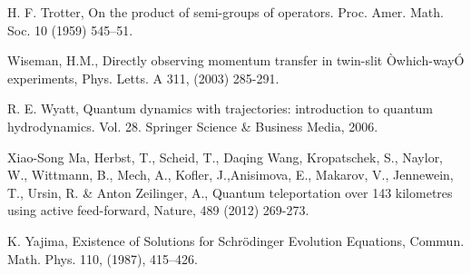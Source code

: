 \documentclass[12pt]{article}%
\begin{document}
\begin{thebibliography}{99}
H. F. Trotter, On the product of semi-groups of operators.
Proc. Amer. Math. Soc. 10 (1959) 545--51.

Wiseman, H.M., Directly observing momentum transfer in
twin-slit \`{O}which-way\'{O} experiments, Phys. Letts. A 311, (2003) 285-291.

R. E. Wyatt, Quantum dynamics with trajectories: introduction
to quantum hydrodynamics. Vol. 28. Springer Science \& Business Media, 2006.

  Xiao-Song Ma, Herbst, T., Scheid, T., Daqing Wang,  Kropatschek, S., Naylor, W., Wittmann, B., Mech, A.,  Kofler, J.,Anisimova, E.,  Makarov, V.,  Jennewein, T., Ursin, R. \& Anton Zeilinger, A., Quantum teleportation over 143 kilometres using active feed-forward,  Nature, 489 (2012) 269-273.


K. Yajima, Existence of Solutions for Schr\"{o}dinger Evolution
Equations, Commun. Math. Phys. 110, (1987), 415--426.
\end{thebibliography}
\end{document}
